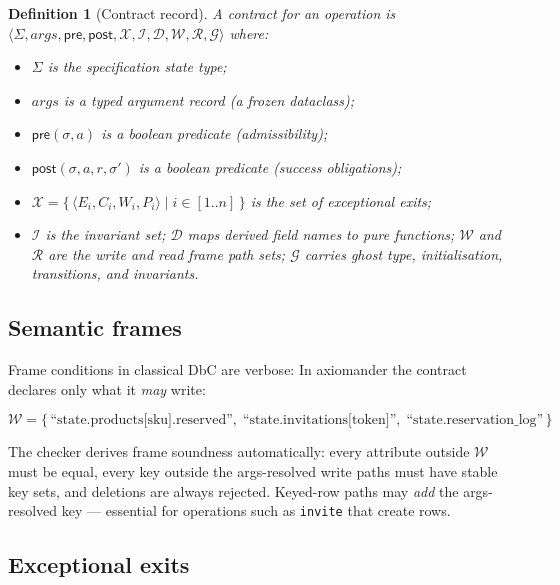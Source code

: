 \documentclass[11pt,a4paper]{article}
\newtheorem{definition}{Definition}
\begin{document}
\begin{definition}[Contract record]\label{def:contract}
A contract for an operation is
$\langle \Sigma, \mathit{args}, \mathsf{pre}, \mathsf{post},
\mathcal{X}, \mathcal{I}, \mathcal{D}, \mathcal{W}, \mathcal{R},
\mathcal{G} \rangle$ where:
\begin{itemize}[nosep,leftmargin=*]
\item $\Sigma$ is the specification state type;
\item $\mathit{args}$ is a typed argument record (a frozen dataclass);
\item $\mathsf{pre}(\sigma, a)$ is a boolean predicate (admissibility);
\item $\mathsf{post}(\sigma, a, r, \sigma')$ is a boolean predicate
  (success obligations);
\item $\mathcal{X} = \{\,\langle E_i, C_i, W_i, P_i\rangle \mid i
  \in [1..n] \,\}$ is the set of exceptional exits;
\item $\mathcal{I}$ is the invariant set; $\mathcal{D}$ maps derived
  field names to pure functions; $\mathcal{W}$ and $\mathcal{R}$ are
  the write and read frame path sets; $\mathcal{G}$ carries ghost
  type, initialisation, transitions, and invariants.
\end{itemize}
\end{definition}

\subsection{Semantic frames}

Frame conditions in classical DbC are verbose:  In
\textsf{axiomander} the contract declares only what it \emph{may}
write:

\[
\mathcal{W} = \{\,
  \text{``state.products[sku].reserved''},\;
  \text{``state.invitations[token]''},\;
  \text{``state.reservation\_log''}
\,\}
\]

The checker derives frame soundness automatically: every attribute
outside $\mathcal{W}$ must be equal, every key outside the
args-resolved write paths must have stable key sets, and deletions are
always rejected.  Keyed-row paths may \emph{add} the args-resolved key
--- essential for operations such as \texttt{invite} that create rows.

\subsection{Exceptional exits}
\end{document}
